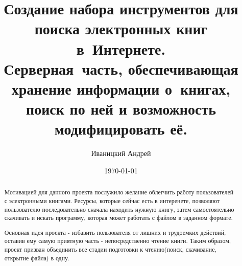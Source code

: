 \documentclass[a4paper,12pt]{article}
\begin{document}
\title{Создание набора инструментов для поиска электронных книг в~Интернете.\\
Серверная~часть, 
обеспечивающая хранение информации о~книгах, поиск по ней и возможность модифицировать её.}
\author{Иваницкий Андрей}
\date{\today}
\maketitle

\newpage


\begin{abstract}

Мотивацией для данного проекта послужило желание облегчить работу пользователей с электронными книгами. Ресурсы, которые сейчас есть в интеренете, позволяют пользователю последовательно сначала находить нужную книгу, затем самостоятельно скачивать и искать программу, которая может работать с файлом в заданном формате.

Основная идея проекта - избавить пользователя от лишних и трудоемких действий, оставив ему самую приятную часть - непосредственно чтение книги. Таким образом, проект призван объединить все стадии подготовки к чтению(поиск, скачивание, открытие файла) в одну.
\end{abstract}

\newpage
\tableofcontents
\newpage


%

%

%

%

%

\end{document}
